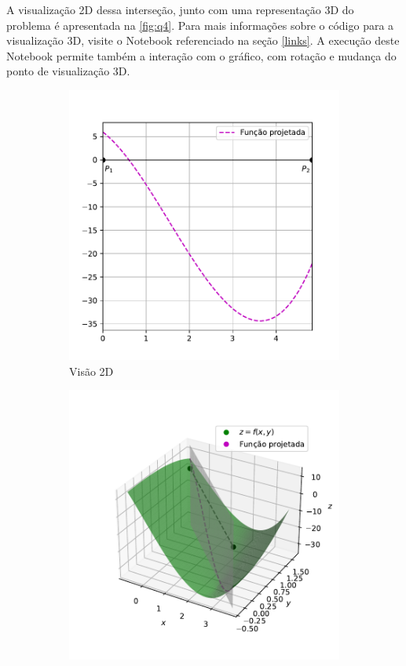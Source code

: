 \documentclass[10pt, a4paper]{article}
\begin{document}
A visualização 2D dessa interseção, junto com uma representação 3D do problema é apresentada na 
\cref{fig:q4}. Para mais informações sobre o código para a visualização 3D, visite o Notebook 
referenciado na seção \ref{links}. A execução deste Notebook permite também a interação com o 
gráfico, com rotação e mudança do ponto de visualização 3D.


\begin{figure}
    \centering
    \begin{subfigure}[b]{0.45\textwidth}
        \centering
        \includegraphics[width=\textwidth]{images/q4_1.pdf}
        \caption{Visão 2D}
        \label{fig:q4_1}
    \end{subfigure}
    \hfill
    \begin{subfigure}[b]{0.5\textwidth}
        \centering
        \includegraphics[width=\textwidth]{images/q4_2.pdf}

\end{subfigure}
\end{figure}
\end{document}
